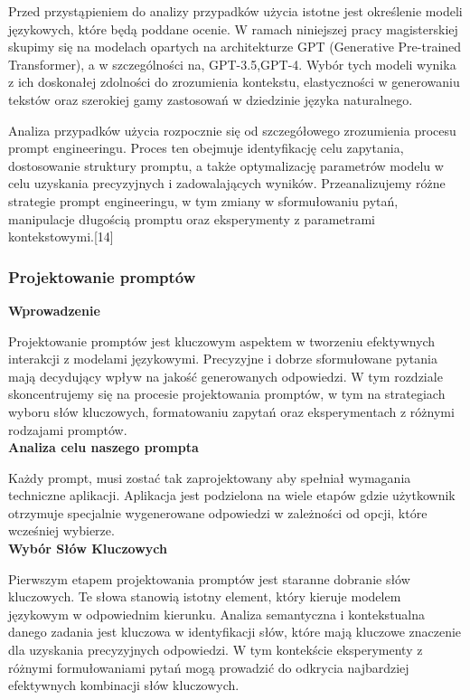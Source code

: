Przed przystąpieniem do analizy przypadków użycia istotne jest określenie modeli językowych, które będą poddane ocenie. W ramach niniejszej pracy magisterskiej skupimy się na modelach opartych na architekturze GPT (Generative Pre-trained Transformer), a w szczególności na, GPT-3.5,GPT-4. Wybór tych modeli wynika z ich doskonałej zdolności do zrozumienia kontekstu, elastyczności w generowaniu tekstów oraz szerokiej gamy zastosowań w dziedzinie języka naturalnego.
 
Analiza przypadków użycia rozpocznie się od szczegółowego zrozumienia procesu prompt engineeringu. Proces ten obejmuje identyfikację celu zapytania, dostosowanie struktury promptu, a także optymalizację parametrów modelu w celu uzyskania precyzyjnych i zadowalających wyników. Przeanalizujemy różne strategie prompt engineeringu, w tym zmiany w sformułowaniu pytań, manipulacje długością promptu oraz eksperymenty z parametrami kontekstowymi.[14]

\subsubsection{Projektowanie promptów}

\noindent\textbf{Wprowadzenie}

Projektowanie promptów jest kluczowym aspektem w tworzeniu efektywnych interakcji z modelami językowymi. Precyzyjne i dobrze sformułowane pytania mają decydujący wpływ na jakość generowanych odpowiedzi. W tym rozdziale skoncentrujemy się na procesie projektowania promptów, w tym na strategiach wyboru słów kluczowych, formatowaniu zapytań oraz eksperymentach z różnymi rodzajami promptów.
\\

\noindent\textbf{Analiza celu naszego prompta}

Każdy prompt, musi zostać tak zaprojektowany aby spełniał wymagania techniczne aplikacji.
Aplikacja jest podzielona na wiele etapów gdzie użytkownik otrzymuje specjalnie wygenerowane odpowiedzi w zależności od opcji, które wcześniej wybierze.
\\

\noindent\textbf{Wybór Słów Kluczowych}

Pierwszym etapem projektowania promptów jest staranne dobranie słów kluczowych. Te słowa stanowią istotny element, który kieruje modelem językowym w odpowiednim kierunku. Analiza semantyczna i kontekstualna danego zadania jest kluczowa w identyfikacji słów, które mają kluczowe znaczenie dla uzyskania precyzyjnych odpowiedzi. W tym kontekście eksperymenty z różnymi formułowaniami pytań mogą prowadzić do odkrycia najbardziej efektywnych kombinacji słów kluczowych.
\\

